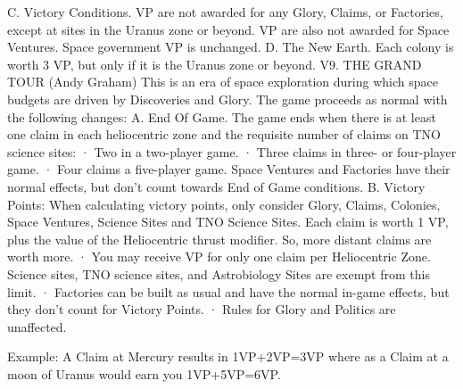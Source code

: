 \documentclass[a4paper]{book}
\begin{document}
C. Victory Conditions. VP are not awarded for any Glory, Claims, or Factories, except at sites in the Uranus zone or beyond. VP are also not awarded for Space Ventures. Space government VP is unchanged.
D. The New Earth. Each colony is worth 3 VP, but only if it is the Uranus zone or beyond.
V9. THE GRAND TOUR (Andy Graham)
This is an era of space exploration during which space budgets are driven by Discoveries and Glory. The game proceeds as normal with the following changes:
A. End Of Game. The game ends when there is at least one claim in each heliocentric zone and the requisite number of claims on TNO science sites:
·       Two in a two-player game.
·       Three claims in three- or four-player game.
·       Four claims a five-player game.
Space Ventures and Factories have their normal effects, but don't count towards End of Game conditions.
B. Victory Points: When calculating victory points, only consider Glory, Claims, Colonies, Space Ventures, Science Sites and TNO Science Sites. Each claim is worth 1 VP, plus the value of the Heliocentric thrust modifier. So, more distant claims are worth more.
·       You may receive VP for only one claim per Heliocentric Zone. Science sites, TNO science sites, and Astrobiology Sites are exempt from this limit.
·       Factories can be built as usual and have the normal in-game effects, but they don't count for Victory Points.
·       Rules for Glory and Politics are unaffected.
 
Example: A Claim at Mercury results in 1VP+2VP=3VP where as a Claim at a moon of Uranus would earn you 1VP+5VP=6VP.
\end{document}
